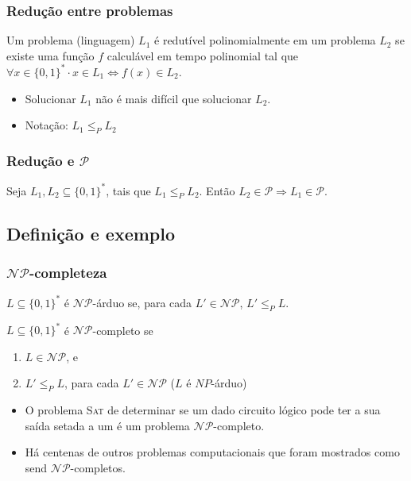 \documentclass{beamer}
\newcommand{\classP}[0]{\ensuremath{\mathcal{P}}\xspace}
\newcommand{\classNP}[0]{\ensuremath{\mathcal{NP}}\xspace}
\begin{document}
\begin{frame}
\frametitle{Redução entre problemas}

\begin{definition}
Um problema (linguagem) $L_1$ é \alert{redutível polinomialmente} em um
problema $L_2$ se existe uma função $f$ calculável em tempo polinomial
tal que $\forall x \in \{0, 1\}^* \cdot x \in L_1 \iff f(x) \in L_2$.
\end{definition}

\begin{itemize}
\item Solucionar $L_1$ não é mais difícil que solucionar $L_2$.
\item Notação: $L_1 \le_P L_2$
\end{itemize}
\end{frame}

\begin{frame}
\frametitle{Redução e $\classP$}

\begin{lemma}
Seja $L_1, L_2 \subseteq \{ 0, 1 \}^*$, tais que $L_1 \le_P L_2$. Então
$L_2 \in \classP \Rightarrow L_1 \in \classP$.
\end{lemma}

\end{frame}

\subsection{Definição e exemplo}

\begin{frame}
\frametitle{$\classNP$-completeza}

\begin{definition}[\classNP-árduo]
$L \subseteq \{ 0, 1 \}^*$ é $\classNP$-árduo se, para cada $L' \in \classNP$, $L' \le_P L$.
\end{definition}

\begin{definition}[$\classNP$-completo]
$L \subseteq \{ 0, 1 \}^*$ é $\classNP$-completo se
\begin{enumerate}
\item $L \in \classNP$, e
\item $L' \le_P L$, para cada $L' \in \classNP$ ($L$ é $NP$-árduo)
\end{enumerate}
\end{definition}

\begin{itemize}
\item O problema \textsc{Sat} de determinar se um dado circuito lógico
  pode ter a sua saída setada a um é um problema \classNP-completo.
\item Há centenas de outros problemas computacionais que foram
  mostrados como send \classNP-completos.
\end{itemize}

\end{frame}
\end{document}
